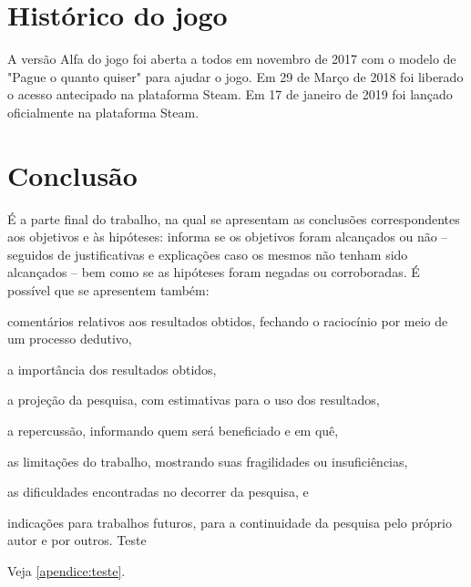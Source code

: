 \documentclass[12pt,oneside,a4paper,chapter=TITLE,section=TITLE,sumario
=tradicional]{abntex2}
\begin{document}
\chapter{Histórico do jogo}
\label{cap:historico-do-jogo}

A versão Alfa do jogo foi aberta a todos em novembro de 2017 com o modelo de "Pague o quanto quiser" para ajudar o jogo.
Em 29 de Março de 2018 foi liberado o acesso antecipado na plataforma Steam.
Em 17 de janeiro de 2019 foi lançado oficialmente na plataforma Steam.

\chapter{Conclusão}

É a parte final do trabalho, na qual se apresentam as conclusões 
correspondentes aos objetivos e às hipóteses: informa se os objetivos foram 
alcançados ou não – seguidos de justificativas e explicações caso os mesmos não 
tenham sido alcançados – bem como se as hipóteses foram negadas ou 
corroboradas. É possível que se apresentem também:

\begin{lista}
    \item comentários relativos aos resultados obtidos, fechando o raciocínio 
    por meio de um processo dedutivo,
    
    \item a importância dos resultados obtidos,
    
    \item a projeção da pesquisa, com estimativas para o uso dos resultados,
    
    \item a repercussão, informando quem será beneficiado e em quê,
    
    \item as limitações do trabalho, mostrando suas fragilidades ou
insuficiências,
    \item as dificuldades encontradas no decorrer da pesquisa, e
    \item indicações para trabalhos futuros, para a continuidade da
pesquisa pelo próprio autor e por outros. Teste
\end{lista}

Veja \autoref{apendice:teste}.

\end{document}
